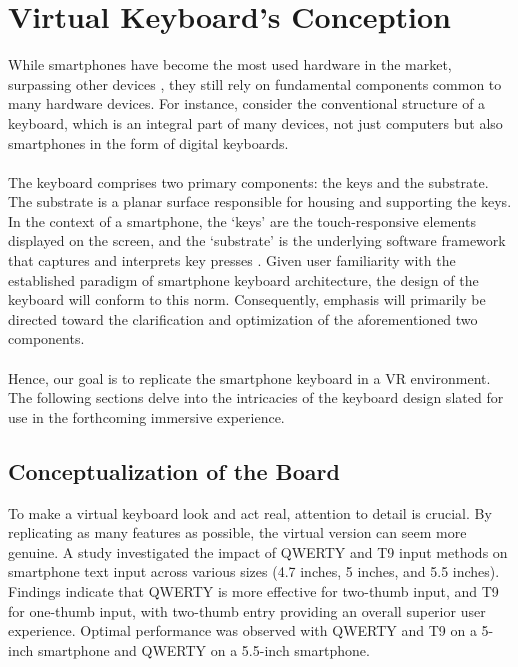 \section{Virtual Keyboard’s Conception}
\label{sec:Virtual Keyboard Conception}
While smartphones have become the most used hardware in the market, surpassing other devices \cite{Laricchia2024}, they still rely on fundamental components common to many hardware devices. For instance, consider the conventional structure of a keyboard, which is an integral part of many devices, not just computers but also smartphones in the form of digital keyboards.\\ \\
The keyboard comprises two primary components: the keys and the substrate. The substrate is a planar surface responsible for housing and supporting the keys. In the context of a smartphone, the ‘keys’ are the touch-responsive elements displayed on the screen, and the ‘substrate’ is the underlying software framework that captures and interprets key presses \cite{Staff2022}. Given user familiarity with the established paradigm of smartphone keyboard architecture, the design of the keyboard will conform to this norm. Consequently, emphasis will primarily be directed toward the clarification and optimization of the aforementioned two components.\\ \\
Hence, our goal is to replicate the smartphone keyboard in a \ac{VR} environment. The following sections delve into the intricacies of the keyboard design slated for use in the forthcoming immersive experience.

\subsection{Conceptualization of the Board}

To make a virtual keyboard look and act real, attention to detail is crucial. By replicating as many features as possible, the virtual version can seem more genuine. A study \cite{Ying2021} investigated the impact of QWERTY and T9 \cite{T9} input methods on smartphone text input across various sizes (4.7 inches, 5 inches, and 5.5 inches). Findings indicate that QWERTY is more effective for two-thumb input, and T9 for one-thumb input, with two-thumb entry providing an overall superior user experience. Optimal performance was observed with QWERTY and T9 on a 5-inch smartphone and QWERTY on a 5.5-inch smartphone.

